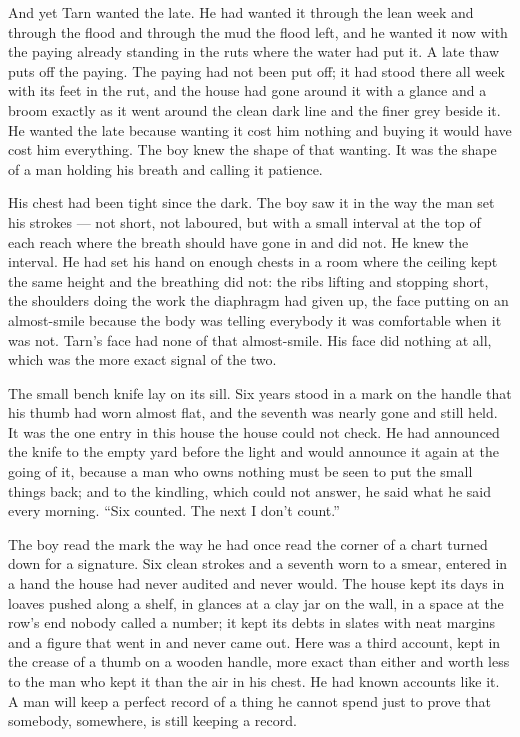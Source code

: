 And yet Tarn wanted the late. He had wanted it through the lean week and through the flood and through the mud the flood left, and he wanted it now with the paying already standing in the ruts where the water had put it. A late thaw puts off the paying. The paying had not been put off; it had stood there all week with its feet in the rut, and the house had gone around it with a glance and a broom exactly as it went around the clean dark line and the finer grey beside it. He wanted the late because wanting it cost him nothing and buying it would have cost him everything. The boy knew the shape of that wanting. It was the shape of a man holding his breath and calling it patience.

\scenebreak

His chest had been tight since the dark. The boy saw it in the way the man set his strokes --- not short, not laboured, but with a small interval at the top of each reach where the breath should have gone in and did not. He knew the interval. He had set his hand on enough chests in a room where the ceiling kept the same height and the breathing did not: the ribs lifting and stopping short, the shoulders doing the work the diaphragm had given up, the face putting on an almost-smile because the body was telling everybody it was comfortable when it was not. Tarn's face had none of that almost-smile. His face did nothing at all, which was the more exact signal of the two.

The small bench knife lay on its sill. Six years stood in a mark on the handle that his thumb had worn almost flat, and the seventh was nearly gone and still held. It was the one entry in this house the house could not check. He had announced the knife to the empty yard before the light and would announce it again at the going of it, because a man who owns nothing must be seen to put the small things back; and to the kindling, which could not answer, he said what he said every morning. “Six counted. The next I don't count.”

The boy read the mark the way he had once read the corner of a chart turned down for a signature. Six clean strokes and a seventh worn to a smear, entered in a hand the house had never audited and never would. The house kept its days in loaves pushed along a shelf, in glances at a clay jar on the wall, in a space at the row's end nobody called a number; it kept its debts in slates with neat margins and a figure that went in and never came out. Here was a third account, kept in the crease of a thumb on a wooden handle, more exact than either and worth less to the man who kept it than the air in his chest. He had known accounts like it. A man will keep a perfect record of a thing he cannot spend just to prove that somebody, somewhere, is still keeping a record.

